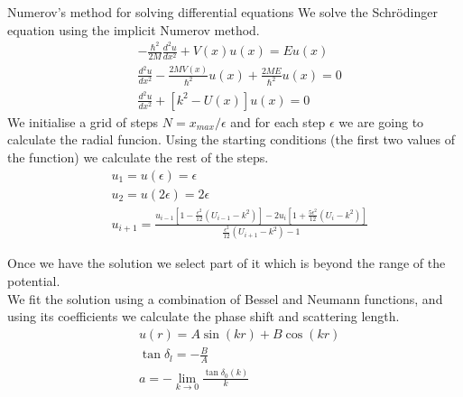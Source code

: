 \begin{frame}[allowframebreaks]{Numerov's method for solving differential equations}
We solve the Schr\"{o}dinger equation using the implicit Numerov method.
\begin{align}
&-\frac{\hbar^2}{2M}\frac{d^2u}{dx^2}+V(x)u(x)=Eu(x)\\
&\frac{d^2u}{dx^2}-\frac{2MV(x)}{\hbar^2}u(x)+\frac{2ME}{\hbar^2}u(x)=0\\
&\frac{d^2u}{dx^2}+[k^2-U(x)]u(x)=0
\end{align}
We initialise a grid of steps $N=x_{max}/\epsilon$ and for each step $\epsilon$ we are going to calculate the radial funcion. Using the starting conditions (the first two values of the function) we calculate the rest of the steps.
\begin{align}
&u_1=u(\epsilon)=\epsilon\\
&u_2=u(2\epsilon)=2\epsilon\\
&u_{i+1}=\frac{u_{i-1}\left[1-\frac{\epsilon^2}{12}(U_{i-1}-k^2)\right]-2u_i\left[1+\frac{5\epsilon^2}{12}(U_i-k^2)\right]}{\frac{\epsilon^2}{12}(U_{i+1}-k^2)-1}
\end{align}

\newpage
Once we have the solution we select part of it which is beyond the range of the potential.\\
We fit the solution using a combination of Bessel and Neumann functions, and using its coefficients we calculate the phase shift and scattering length.
\begin{align}
&u(r)=A\sin(kr)+B\cos(kr)\\
&\tan\delta_l=-\frac{B}{A}\\
&a=-\lim_{k\to 0}\frac{\tan\delta_0(k)}{k}
\end{align}
\end{frame}

